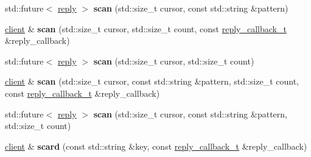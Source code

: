 \begin{DoxyCompactItemize}
\item 
\mbox{\label{classcpp__redis_1_1client_aace969fbd009fb0a1fd29950f1e70d35}} 
std\+::future$<$ \mbox{\hyperlink{classcpp__redis_1_1reply}{reply}} $>$ {\bfseries scan} (std\+::size\+\_\+t cursor, const std\+::string \&pattern)
\item 
\mbox{\label{classcpp__redis_1_1client_a08887add5a0427c6e889e85c7178535d}} 
\mbox{\hyperlink{classcpp__redis_1_1client}{client}} \& {\bfseries scan} (std\+::size\+\_\+t cursor, std\+::size\+\_\+t count, const \mbox{\hyperlink{classcpp__redis_1_1client_af7a65eb21aa25230bfbb0b0203c4fc04}{reply\+\_\+callback\+\_\+t}} \&reply\+\_\+callback)
\item 
\mbox{\label{classcpp__redis_1_1client_a6bf21e9defd17965b2c1ca9b3db8c539}} 
std\+::future$<$ \mbox{\hyperlink{classcpp__redis_1_1reply}{reply}} $>$ {\bfseries scan} (std\+::size\+\_\+t cursor, std\+::size\+\_\+t count)
\item 
\mbox{\label{classcpp__redis_1_1client_a3711dfc9f6f26899cdbe50b2cabaf36e}} 
\mbox{\hyperlink{classcpp__redis_1_1client}{client}} \& {\bfseries scan} (std\+::size\+\_\+t cursor, const std\+::string \&pattern, std\+::size\+\_\+t count, const \mbox{\hyperlink{classcpp__redis_1_1client_af7a65eb21aa25230bfbb0b0203c4fc04}{reply\+\_\+callback\+\_\+t}} \&reply\+\_\+callback)
\item 
\mbox{\label{classcpp__redis_1_1client_acd0717c75c4d75108cefc2c9a722527e}} 
std\+::future$<$ \mbox{\hyperlink{classcpp__redis_1_1reply}{reply}} $>$ {\bfseries scan} (std\+::size\+\_\+t cursor, const std\+::string \&pattern, std\+::size\+\_\+t count)
\item 
\mbox{\label{classcpp__redis_1_1client_a4be40b061ee915a236218e5e2fd76206}} 
\mbox{\hyperlink{classcpp__redis_1_1client}{client}} \& {\bfseries scard} (const std\+::string \&key, const \mbox{\hyperlink{classcpp__redis_1_1client_af7a65eb21aa25230bfbb0b0203c4fc04}{reply\+\_\+callback\+\_\+t}} \&reply\+\_\+callback)
\item 
\mbox{\label{classcpp__redis_1_1client_a089148ca908f563e7b73649aac3bd01e}} 

\end{DoxyCompactItemize}
